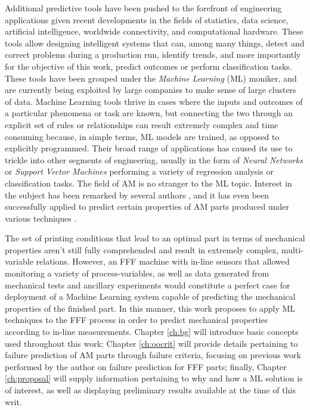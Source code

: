 \documentclass[main.tex]{subfiles}
\begin{document}
Additional predictive tools have been pushed to the forefront of engineering applications given recent developments in the fields of statistics, data science, artificial intelligence, worldwide connectivity, and computational hardware. These tools allow designing intelligent systems that can, among many things, detect and correct problems during a production run, identify trends, and more importantly for the objective of this work, predict outcomes or perform classification tasks. These tools have been grouped under the \emph{Machine Learning} (ML) moniker, and are currently being exploited by large companies to make sense of large clusters of data. Machine Learning tools thrive in cases where the inputs and outcomes of a particular phenomena or task are known, but connecting the two through an explicit set of rules or relationships can result extremely complex and time consuming \cite{Chollet2018} because, in simple terms, ML models are trained, as opposed to explicitly programmed. Their broad range of applications has caused its use to trickle into other segments of engineering, usually in the form of \emph{Neural Networks} or \emph{Support Vector Machines} performing a variety of regression analysis or classification tasks. The field of AM is no stranger to the ML topic. Interest in the subject has been remarked by several authors \cite{Qi2019, Razvi2019, Meng2020}, and it has even been successfully applied to predict certain properties of AM parts produced under various techniques \cite{Qi2019, Razvi2019, Meng2020, Sood2012}. 

The set of printing conditions that lead to an optimal part in terms of mechanical properties aren't still fully comprehended and result in extremely complex, multi-variable relations. However, an FFF machine with in-line sensors that allowed monitoring a variety of process-variables, as well as data generated from mechanical tests and ancillary experiments would constitute a perfect case for deployment of a Machine Learning system capable of predicting the mechanical properties of the finished part. In this manner, this work proposes to apply ML techniques to the FFF process in order to predict mechanical properties according to in-line measurements. Chapter \ref{ch:bg} will introduce basic concepts used throughout this work; Chapter \ref{ch:oocrit} will provide details pertaining to failure prediction of AM parts through failure criteria, focusing on previous work performed by the author on failure prediction for FFF parts; finally, Chapter \ref{ch:proposal} will supply information pertaining to why and how a ML solution is of interest, as well as displaying preliminary results available at the time of this writ.

% 
%
%
%
%
%
%
%
\end{document}
